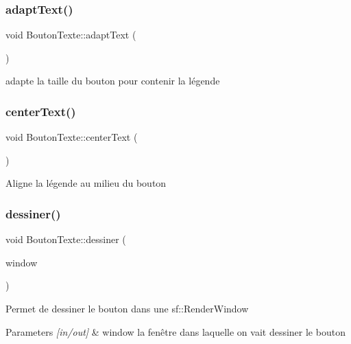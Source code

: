 \subsubsection{\texorpdfstring{adapt\+Text()}{adaptText()}}
{\footnotesize\ttfamily void Bouton\+Texte\+::adapt\+Text (\begin{DoxyParamCaption}{ }\end{DoxyParamCaption})\hspace{0.3cm}{\ttfamily [protected]}}

adapte la taille du bouton pour contenir la légende \mbox{\label{classBoutonTexte_a3b9eef3a26d8925c558582a7216c8e3c}} 
\subsubsection{\texorpdfstring{center\+Text()}{centerText()}}
{\footnotesize\ttfamily void Bouton\+Texte\+::center\+Text (\begin{DoxyParamCaption}{ }\end{DoxyParamCaption})\hspace{0.3cm}{\ttfamily [protected]}}

Aligne la légende au milieu du bouton \mbox{\label{classBoutonTexte_a144df8e92d58470bc15b87dd13b6c3ef}} 
\subsubsection{\texorpdfstring{dessiner()}{dessiner()}}
{\footnotesize\ttfamily void Bouton\+Texte\+::dessiner (\begin{DoxyParamCaption}\item[{sf\+::\+Render\+Window \&}]{window }\end{DoxyParamCaption})}

Permet de dessiner le bouton dans une sf\+::\+Render\+Window 
\begin{DoxyParams}{Parameters}
{\em \mbox{[}in/out\mbox{]}} & window la fenêtre dans laquelle on vait dessiner le bouton \\
\hline
\end{DoxyParams}
\mbox{\label{classBoutonTexte_a8f5bb56ad2161d1d204ee73af9d68eb8}} 
